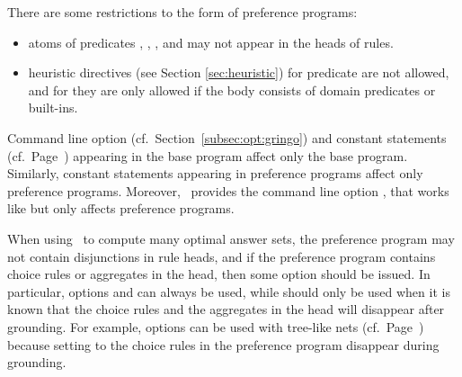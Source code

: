 \begin{note}
There are some restrictions to the form of preference programs: 
\begin{itemize}
\item 
atoms of predicates , , 
,  and 
may not appear in the heads of rules.%
\item
heuristic directives (see Section \ref{sec:heuristic}) for predicate  are not allowed, 
and for  they are only allowed if the body consists of domain predicates or built-ins.
\end{itemize}
\end{note}

\begin{note}
Command line option
 (cf.\ Section~\ref{subsec:opt:gringo}) 
and
constant statements (cf.\ Page~\pageref{subset:gringo:meta:const})
appearing in the base program
affect only the base program.
%
Similarly, 
constant statements appearing in preference programs affect only preference programs.
%
Moreover, \asprin\ provides the command line option ,
that works like  but only affects preference programs.
\end{note}

\begin{note}\label{asprin:note:meta}
When using \asprin\ to compute many optimal answer sets,
the preference program may not contain disjunctions in rule heads,
and if the preference program contains choice rules or aggregates in the head,
then some  option should be issued.
%
In particular, options  and  can always be used, 
while  should only be used when it is known that the choice rules 
and the aggregates in the head will disappear after grounding. 
%
For example, options  can be used with tree-like  nets
(cf.\ Page~\pageref{asprin:cp}) because setting  to 
the choice rules in the  preference program disappear during grounding.
\end{note}

